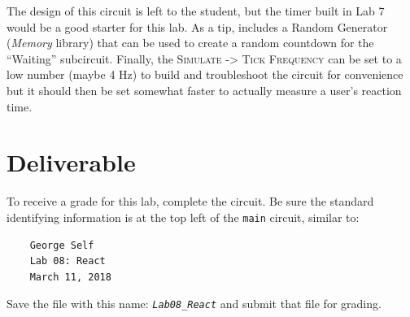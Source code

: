 The design of this circuit is left to the student, but the timer built in Lab 7 would be a good starter for this lab. As a tip, \LE includes a Random Generator (\textit{Memory} library) that can be used to create a random countdown for the ``Waiting'' subcircuit. Finally, the \textsc{Simulate -> Tick Frequency} can be set to a low number (maybe 4 Hz) to build and troubleshoot the circuit for convenience but it should then be set somewhat faster to actually measure a user's reaction time.

\section{Deliverable}

To receive a grade for this lab, complete the circuit. Be sure the standard identifying information is at the top left of the \lstinline{main} circuit, similar to: 

\bigskip
\begin{minipage}{\linewidth}
	\begin{verbatim}
	George Self
	Lab 08: React
	March 11, 2018
	\end{verbatim}
\end{minipage}
\bigskip

Save the file with this name: \emph{\texttt{Lab08\_React}} and submit that file for grading.

